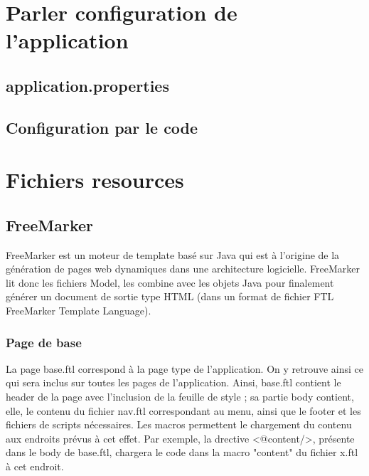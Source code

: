 	\section{Parler configuration de l'application}

		\subsection{application.properties}


		\subsection{Configuration par le code}


	\section{Fichiers resources}

		\subsection{FreeMarker}
			FreeMarker est un moteur de template basé sur Java qui est à l'origine de la génération de pages web dynamiques dans une architecture logicielle.\newline
			FreeMarker lit donc les fichiers Model, les combine avec les objets Java pour finalement générer un document de sortie type HTML (dans un format de fichier FTL FreeMarker Template Language).

			\subsubsection{Page de base}

				La page base.ftl correspond à la page type de l'application. On y retrouve ainsi ce qui sera inclus sur toutes les pages de l'application. \newline
				Ainsi, base.ftl contient le header de la page avec l'inclusion de la feuille de style ; sa partie body contient, elle, le contenu du fichier nav.ftl correspondant au menu, ainsi que le footer et les fichiers de scripts nécessaires.\newline
				Les macros permettent le chargement du contenu aux endroits prévus à cet effet. Par exemple, la drective <@content/>, présente dans le body de base.ftl, chargera le code dans la macro "content" du fichier x.ftl à cet endroit.

